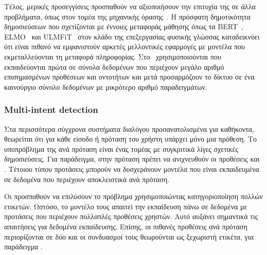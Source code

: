 Τέλος, μερικές προσεγγίσεις προσπαθούν να αξιοποιήσουν την επιτυχία της  σε άλλα προβλήματα,
όπως στον τομέα της μηχανικής όρασης~\cite{sharif2014cnn,girshick2014rich,donahue2014decaf}.
Η πρόσφατη δημοτικότητα δημοσιεύσεων που σχετίζονται με έννοιες μεταφοράς μάθησης όπως τα BERT~\cite{bert}, ELMO~\cite{elmo} και ULMFiT~\cite{ulmfit} στον κλάδο της επεξεργασίας φυσικής γλώσσας
καταδεικνύει ότι είναι πιθανό να εμφανιστούν αρκετές μελλοντικές εφαρμογές με μοντέλα που εκμεταλλεύονται τη μεταφορά πληροφορίας.
Στο~\cite{goyal2018fast} χρησιμοποιούνται
που εκπαιδεύονται πρώτα σε σύνολα δεδομένων που περιέχουν μεγάλο αριθμό επισημασμένων προθέσεων και οντοτήτων και μετά προσαρμόζουν το δίκτυο σε ένα καινούργιο σύνολο δεδομένων με μικρότερο αριθμό παραδειγμάτων.

\subsubsection{Multi-intent detection}\label{subsec:multi-intent}
Στα περισσότερα σύγχρονα συστήματα διαλόγου προσανατολισμένα για καθήκοντα, θεωρείται ότι για κάθε είσοδο ή πρόταση του χρήστη υπάρχει μόνο μια πρόθεση.
Το υποπρόβλημα της
ανά πρόταση είναι ένας τομέας με συγκριτικά λίγες σχετικές δημοσιεύσεις.
Για παράδειγμα, στην πρόταση  πρέπει να ανιχνευθούν οι προθέσεις  και .
Τέτοιου τύπου προτάσεις μπορούν να δυσχεράνουν μοντέλα που είναι εκπαιδευμένα σε δεδομένα που περιέχουν αποκλειστικά  ανά πρόταση.

Οι \citet{xu2013exploiting} προσπαθούν να επιλύσουν το πρόβλημα χρησιμοποιώντας κατηγοριοποίηση πολλών ετικετών.
Ωστόσο, το μοντέλο τους απαιτεί την εκπαίδευση πάνω σε δεδομένα με προτάσεις που περιέχουν πολλαπλές προθέσεις χρηστών.
Αυτό αυξάνει σημαντικά τις απαιτήσεις για δεδομένα εκπαίδευσης.
Επίσης, οι πιθανές προθέσεις ανά πρόταση περιορίζονται σε δύο και οι συνδυασμοί τους θεωρούνται ως ξεχωριστή ετικέτα,
για παράδειγμα .

